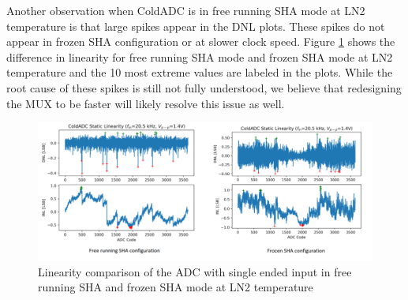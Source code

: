 Another observation when ColdADC is in free running SHA mode at LN2 temperature is that large spikes appear in the DNL plots. These spikes do not appear in frozen SHA configuration or at slower clock speed. Figure \ref{fig:linearity_free_frozen} shows the difference in linearity for free running SHA mode and frozen SHA mode at LN2 temperature and the 10 most extreme values are labeled in the plots. While the root cause of these spikes is still not fully understood, we believe that redesigning the MUX to be faster will likely resolve this issue as well.
\begin{figure}[h!]
\centering
  \includegraphics[width=1\linewidth]{figures/prakash_fig/linearity_free_frozen.png}
  \caption{Linearity comparison of the ADC with single ended input in free running SHA and frozen SHA mode at LN2 temperature}
  \label{fig:linearity_free_frozen}
\end{figure}
